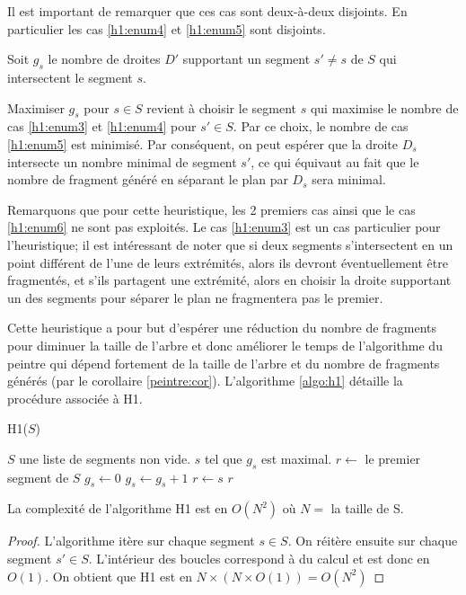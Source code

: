 Il est important de remarquer que ces cas sont deux-à-deux disjoints.
En particulier les cas \ref{h1:enum4} et \ref{h1:enum5} sont disjoints.

Soit $g_s$ le nombre de droites $D'$ supportant un segment $s' \neq s$
de $S$ qui intersectent le segment $s$.

Maximiser $g_s$ pour $s \in S$ revient à choisir le segment $s$ qui maximise
le nombre de cas \ref{h1:enum3} et \ref{h1:enum4} pour $s' \in S$.
Par ce choix, le nombre de cas \ref{h1:enum5} est minimisé.
Par conséquent, on peut espérer que la droite $D_s$ intersecte un
nombre minimal de segment $s'$, ce qui équivaut au fait que le
nombre de fragment généré en séparant le plan par $D_s$ sera minimal.

Remarquons que pour cette heuristique, les 2 premiers cas ainsi que
le cas \ref{h1:enum6} ne sont pas exploités.
Le cas \ref{h1:enum3} est un cas particulier pour l'heuristique;
il est intéressant de noter que si deux segments s'intersectent
en un point différent de l'une de leurs extrémités, alors ils devront
éventuellement être fragmentés, et s'ils partagent une extrémité, alors
en choisir la droite supportant un des segments pour séparer le plan ne
fragmentera pas le premier.

Cette heuristique a pour but d'espérer une réduction du nombre de fragments
pour diminuer la taille de l'arbre
et donc améliorer le temps de l'algorithme du peintre qui dépend
fortement de la taille de l'arbre et du nombre de fragments générés (par
le corollaire \ref{peintre:cor}). L'algorithme \ref{algo:h1} détaille
la procédure associée à H1.

\begin{algorithm}
  \caption{H1($S$)}
  \begin{algorithmic}[1] \label{algo:h1}
    \REQUIRE $S$ une liste de segments non vide.
    \ENSURE $s$ tel que $g_s$ est maximal.
    \STATE$r\leftarrow$ le premier segment de $S$
    \STATE $g_s\leftarrow 0$
    \ENDFOR
    \STATE $g_s\leftarrow g_s +1$
    \ENDIF
    \ENDFOR
    \STATE $r\leftarrow s$
    \ENDIF
    \ENDFOR
    \RETURN $r$
  \end{algorithmic}
\end{algorithm}

\begin{prop}
  La complexité de l'algorithme H1 est en $O(N^2)$ où $N =$ la taille de S.
\end{prop}
\begin{proof}
  L'algorithme itère sur chaque segment $s \in S$.
  On réitère ensuite sur chaque segment $s' \in S$.
  L'intérieur des boucles correspond à du calcul et
  est donc en $O(1)$. On obtient que H1 est en $N\times(N\times{}O(1)) = O(N^2)$
\end{proof}



